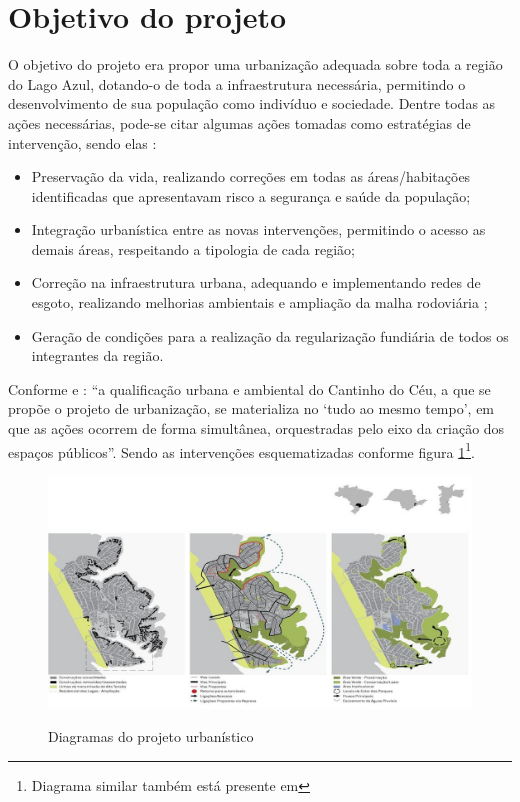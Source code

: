 	\section{Objetivo do projeto}
	
	O objetivo do projeto era propor uma urbanização adequada sobre toda a região do Lago Azul, dotando-o de toda a infraestrutura necessária, permitindo o desenvolvimento de sua população como indivíduo e sociedade. Dentre todas as ações necessárias, pode-se citar algumas ações tomadas como estratégias de intervenção, sendo elas \cite{Archdaily2013} \cite[p.28]{Barda2012}:
	
	\begin{itemize}
	    \item Preservação da vida, realizando correções em todas as áreas/habitações identificadas que apresentavam risco a segurança e saúde da população;
	    \item Integração urbanística entre as novas intervenções, permitindo o acesso as demais áreas, respeitando a tipologia de cada região;
	    \item Correção na infraestrutura urbana, adequando e implementando redes de esgoto, realizando melhorias ambientais e ampliação da malha rodoviária ;
	    \item Geração de condições para a realização da regularização fundiária de todos os integrantes da região.
	\end{itemize}
	
	Conforme  e : ``a qualificação urbana e ambiental do Cantinho do Céu, a que se propõe o projeto de urbanização, se materializa no  `tudo ao mesmo tempo', em que as ações ocorrem de forma simultânea, orquestradas pelo eixo da criação dos espaços públicos''. Sendo as intervenções esquematizadas conforme figura \ref{fig:proposta_arq}\footnote{Diagrama similar também está presente em }.
	
	\begin{figure}[htb]
		\centering
		\caption{Diagramas do projeto urbanístico}
		\includegraphics[width=\linewidth]{img/proposta}
		\label{fig:proposta_arq}
	\end{figure}
	
